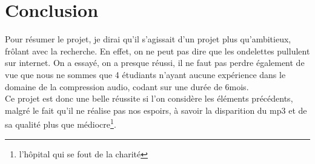 \documentclass[a4paper,12pt]{report}
\begin{document}
\chapter{Conclusion}
Pour résumer le projet, je dirai qu'il s'agissait d'un projet plus qu'ambitieux,
frôlant avec la recherche. En effet, on ne peut pas dire que les ondelettes
pullulent sur internet. On a essayé, on a presque réussi, il ne faut pas perdre
également de vue que nous ne sommes que 4 étudiants n'ayant aucune expérience
dans le domaine de la compression audio, codant sur une durée de 6mois.\\
Ce projet est donc une belle réussite si l'on considère les éléments
précédents, malgré le fait qu'il ne réalise pas nos espoirs, à savoir la
disparition du mp3 et de sa qualité plus que médiocre\footnote{l'hôpital qui se
fout de la charité}.
\end{document}
